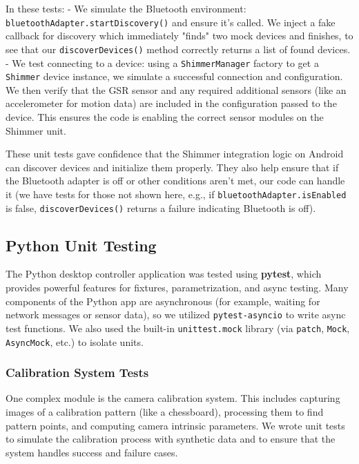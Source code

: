 \documentclass[11pt,a4paper]{report}
\begin{document}
In these tests: - We simulate the Bluetooth environment:
\texttt{bluetoothAdapter.startDiscovery()} and ensure it's called. We inject a
fake callback for discovery which immediately "finds" two mock devices
and finishes, to see that our \texttt{discoverDevices()} method correctly
returns a list of found devices. - We test connecting to a device: using
a \texttt{ShimmerManager} factory to get a \texttt{Shimmer} device instance, we
simulate a successful connection and configuration. We then verify that
the GSR sensor and any required additional sensors (like an
accelerometer for motion data) are included in the configuration passed
to the device. This ensures the code is enabling the correct sensor
modules on the Shimmer unit.

These unit tests gave confidence that the Shimmer integration logic on
Android can discover devices and initialize them properly. They also
help ensure that if the Bluetooth adapter is off or other conditions
aren't met, our code can handle it (we have tests for those not shown
here, e.g., if \texttt{bluetoothAdapter.isEnabled} is false,
\texttt{discoverDevices()} returns a failure indicating Bluetooth is off).

\subsection{Python Unit Testing}

The Python desktop controller application was tested using \textbf{pytest},
which provides powerful features for fixtures, parametrization, and
async testing. Many components of the Python app are asynchronous (for
example, waiting for network messages or sensor data), so we utilized
\texttt{pytest-asyncio} to write async test functions. We also used the
built-in \texttt{unittest.mock} library (via \texttt{patch}, \texttt{Mock}, \texttt{AsyncMock},
etc.) to isolate units.

\subsubsection{Calibration System Tests}

One complex module is the camera calibration system. This includes
capturing images of a calibration pattern (like a chessboard),
processing them to find pattern points, and computing camera intrinsic
parameters. We wrote unit tests to simulate the calibration process with
synthetic data and to ensure that the system handles success and failure
cases.
\end{document}
